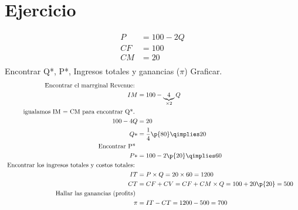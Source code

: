 \section{Ejercicio}
\begin{center}
   \begin{align*}
       P &= 100 - 2Q \\ 
       CF &= 100 \\ 
       CM &= 20 \\ 
   \end{align*}
   Encontrar Q*, P*, Ingresos totales y ganancias ($\pi $) Graficar.
   \begin{align*}
       \text{ Encontrar el marrginal Revenue:  } \\ 
       IM &= 100 - \underbrace{4}_{\times 2}  Q \\ 
       \text{ igualamos IM = CM para encontrar Q*.  } \\ 
       100 - 4 Q &= 20 \\ 
        Q* &= \frac{1}{4} \p{80} \qimplies 20 \\  
        \text{ Encontrar P* } \\ 
        P* &= 100 - 2\p{20} \qimplies 60 \\ 
        \text{ Encontrar los ingresos totales y costos totales: } \\ 
        IT &= P \times Q = 20 \times 60 = 1200 \\ 
        CT &= CF + CV = CF + CM \times Q = 100 + 20 \p{20} = 500 \\ 
        \text{ Hallar las ganancias (profits) } \\ 
        \pi &= IT - CT = 1200 - 500 = 700 \\ 
   \end{align*}
   \begin{figure}[H]
       \centering

\end{figure}
\end{center}
